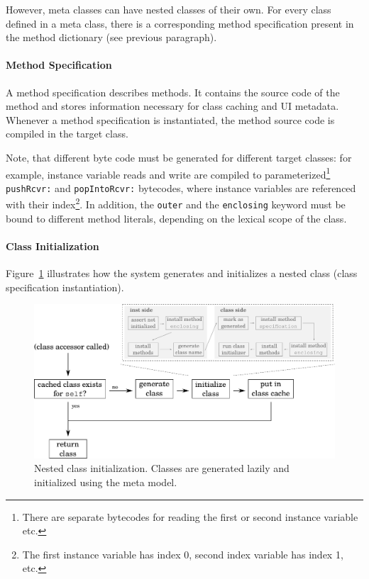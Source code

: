 However, meta classes can have nested classes of their own. For every class defined in a meta class, there is a corresponding method specification present in the method dictionary (see previous paragraph).

\paragraph{Method Specification}
A method specification describes methods. It contains the source code of the method and stores information necessary for class caching and UI metadata. Whenever a method specification is instantiated, the method source code is compiled in the target class. 

Note, that different byte code must be generated for different target classes: for example, instance variable reads and write are compiled to parameterized\footnote{There are separate bytecodes for reading the first or second instance variable etc.} \texttt{pushRcvr:} and \texttt{popIntoRcvr:} bytecodes, where instance variables are referenced with their index\footnote{The first instance variable has index 0, second index variable has index 1, etc.}. In addition, the \texttt{outer} and the \texttt{enclosing} keyword must be bound to different method literals, depending on the lexical scope of the class.

\paragraph{Class Initialization}
Figure~\ref{fig:lazy_class_gen} illustrates how the system generates and initializes a nested class (class specification instantiation). 

\begin{figure}
	\includegraphics[width=\textwidth]{lazy_class_gen.pdf}
	\centering
	\caption[Nested class initialization]{Nested class initialization. Classes are generated lazily and initialized using the \msname meta model.}
	\label{fig:lazy_class_gen}
\end{figure}

